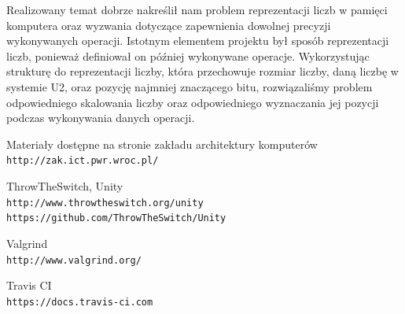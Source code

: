 \documentclass{article}
\begin{document}
Realizowany temat dobrze nakreślił nam problem reprezentacji liczb w pamięci komputera oraz wyzwania dotyczące zapewnienia dowolnej precyzji wykonywanych operacji. Istotnym elementem projektu był sposób reprezentacji liczb, ponieważ definiował on później wykonywane operacje. Wykorzystując strukturę do reprezentacji liczby, która przechowuje rozmiar liczby, daną liczbę w systemie U2, oraz pozycję najmniej znaczącego bitu, rozwiązaliśmy problem odpowiedniego skalowania liczby oraz odpowiedniego wyznaczania jej pozycji podczas wykonywania danych operacji.



\newpage

\begin{thebibliography}{9}

Materiały dostępne na stronie zakładu architektury komputerów 
\\\texttt{http://zak.ict.pwr.wroc.pl/}

ThrowTheSwitch, Unity
\\\texttt{http://www.throwtheswitch.org/unity}
\\\texttt{https://github.com/ThrowTheSwitch/Unity}
 
Valgrind
\\\texttt{http://www.valgrind.org/}

Travis CI
\\\texttt{https://docs.travis-ci.com}
\end{thebibliography}
\end{document}
